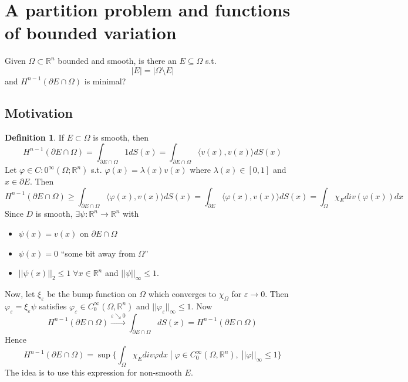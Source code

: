 \documentclass[a4paper, 12pt]{article}
\theoremstyle{plain}
\theoremstyle{definition}
\newtheorem{definition}[theorem]{Definition} %
\theoremstyle{lemma}
\theoremstyle{remark}
\theoremstyle{corollary}
\theoremstyle{example}
\begin{document}
\section{A partition problem and functions of bounded variation}
	Given $\Omega \subset \mathbb{R}^n$ bounded and smooth, is there an $E \subseteq \Omega$ s.t. \[\left|E\right| = \left|\Omega \setminus E\right|\]
	and $H^{n-1}(\partial E\cap \Omega)$ is minimal?
	\subsection{Motivation}
	\begin{definition}
		If $E \subset \Omega$ is smooth, then \[H^{n-1}(\partial E \cap \Omega) = \int_{\partial E \cap \Omega} 1 dS(x) = \int_{\partial E \cap \Omega} \langle v(x), v(x) \rangle dS(x)\]
		Let $\varphi \in C:0^\infty(\Omega; \mathbb{R}^n)$ s.t. $\varphi(x) = \lambda(x)v(x)$ where $\lambda(x) \in [0,1]$ and $x \in \partial E$. Then $$H^{n-1}(\partial E \cap \Omega) \geq \int_{\partial E \cap \Omega} \langle \varphi(x), v(x)\rangle dS(x) = \int_{\partial E} \langle \varphi(x), v(x)\rangle dS(x) = \int_\Omega \chi_E div(\varphi(x))dx$$
		Since $D$ is smooth, $\exists \psi: \mathbb{R}^n \to \mathbb{R}^n$ with \begin{itemize}
			\item $\psi(x) = v(x)$ on $\partial E \cap \Omega$
			\item $\psi(x) = 0$ ``some bit away from $\Omega$''
			\item $||\psi(x)||_2 \leq 1 \; \forall x \in \mathbb{R}^n$ and $||\psi||_\infty \leq 1$.
		\end{itemize}
		Now, let $\xi_\varepsilon$ be the bump function on $\Omega$ which converges to $\chi_\Omega$ for $\varepsilon \to 0$. Then $\varphi_\varepsilon = \xi_\varepsilon \psi$ satisfies $\varphi_\varepsilon \in C_0^\infty(\Omega, \mathbb{R}^n)$ and $||\varphi_\varepsilon||_\infty \leq 1$. Now \[H^{n-1}(\partial E \cap \Omega) \overset{\varepsilon \searrow 0}{\to} \int_{\partial E \cap \Omega} dS(x) = H^{n-1}(\partial E \cap \Omega)\]
		Hence \[H^{n-1}(\partial E \cap \Omega) = \sup\{\int_\Omega \chi_E div \varphi dx \; | \; \varphi \in C_0^\infty(\Omega, \mathbb{R}^n), \; ||\varphi||_\infty \leq 1\}\]
		The idea is to use this expression for non-smooth $E$.
	\end{definition}
\end{document}
